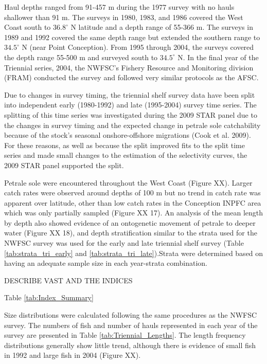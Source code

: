 \documentclass[12pt,]{article}
\begin{document}
Haul depths ranged from 91-457 m during the 1977 survey with no hauls
shallower than 91 m. The surveys in 1980, 1983, and 1986 covered the
West Coast south to \(36.8^\circ\) N latitude and a depth range of
55-366 m. The surveys in 1989 and 1992 covered the same depth range but
extended the southern range to \(34.5^\circ\) N (near Point Conception).
From 1995 through 2004, the surveys covered the depth range 55-500 m and
surveyed south to \(34.5^\circ\) N. In the final year of the Triennial
series, 2004, the NWFSC's Fishery Resource and Monitoring division
(FRAM) conducted the survey and followed very similar protocols as the
AFSC.

Due to changes in survey timing, the triennial shelf survey data have
been split into independent early (1980-1992) and late (1995-2004)
survey time series. The splitting of this time series was investigated
during the 2009 STAR panel due to the changes in survey timing and the
expected change in petrale sole catchability because of the stock's
seasonal onshore-offshore migrations (Cook et al. 2009). For these
reasons, as well as because the split improved fits to the split time
series and made small changes to the estimation of the selectivity
curves, the 2009 STAR panel supported the split.

Petrale sole were encountered throughout the West Coast (Figure XX).
Larger catch rates were observed around depths of 100 m but no trend in
catch rate was apparent over latitude, other than low catch rates in the
Conception INPFC area which was only partially sampled (Figure XX 17).
An analysis of the mean length by depth also showed evidence of an
ontogenetic movement of petrale to deeper water (Figure XX 18), and
depth stratification similar to the strata used for the NWFSC survey was
used for the early and late triennial shelf survey (Table
\ref{tab:strata_tri_early} and \ref{tab:strata_tri_late}).Strata were
determined based on having an adequate sample size in each year-strata
combination.

DESCRIBE VAST AND THE INDICES

Table \ref{tab:Index_Summary}

Size distributions were calculated following the same procedures as the
NWFSC survey. The numbers of fish and number of hauls represented in
each year of the survey are presented in Table
\ref{tab:Triennial_Lengths}. The length frequency distributions
generally show little trend, although there is evidence of small fish in
1992 and large fish in 2004 (Figure XX).
\end{document}
